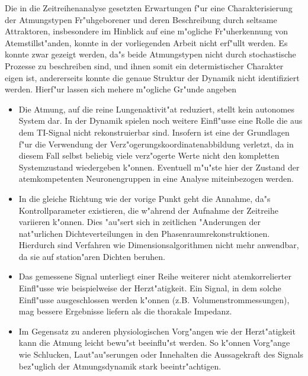 
Die in die Zeitreihenanalyse gesetzten Erwartungen f"ur eine Charakterisierung der
Atmungstypen Fr"uhgeborener und deren Beschreibung durch seltsame Attraktoren,
insbesondere im Hinblick auf eine m"ogliche Fr"uherkennung von Atemstillst"anden, konnte
in der vorliegenden Arbeit nicht erf"ullt werden. Es konnte zwar gezeigt werden, da"s
beide Atmungstypen nicht durch stochastische Prozesse zu beschreiben sind, und ihnen somit
ein determistischer Charakter eigen ist, andererseits konnte die genaue Struktur der
Dynamik nicht identifiziert werden. Hierf"ur lassen sich mehere m"ogliche Gr"unde angeben

\begin{itemize}
\item Die Atmung, auf die reine Lungenaktivit"at reduziert, stellt kein autonomes System
  dar. In der Dynamik spielen noch weitere Einfl"usse eine Rolle die aus dem TI-Signal
  nicht rekonstruierbar sind. Insofern ist eine der Grundlagen f"ur die Verwendung der
  Verz"ogerungskoordinatenabbildung verletzt, da in diesem Fall selbst beliebig viele verz"ogerte
  Werte nicht den kompletten Systemzustand wiedergeben k"onnen.  Eventuell m"u"ste hier
  der Zustand der atemkompetenten Neuronengruppen in eine Analyse miteinbezogen werden.
  
\item In die gleiche Richtung wie der vorige Punkt geht die Annahme, da"s
  Kontrollparameter existieren, die w"ahrend der Aufnahme der Zeitreihe variieren k"onnen.
  Dies "au"sert sich in zeitlichen "Anderungen der nat"urlichen Dichteverteilungen in den
  Phasenraumrekonstruktionen. Hierdurch sind Verfahren wie Dimensionsalgorithmen nicht
  mehr anwendbar, da sie auf station"aren Dichten beruhen.
  
\item Das gemessene Signal unterliegt einer Reihe weiterer nicht atemkorrelierter
  Einfl"usse wie beispielweise der Herzt"atigkeit. Ein Signal, in dem solche Einfl"usse
  ausgeschlossen werden k"onnen (z.B. Volumenstrommessungen), mag bessere Ergebnisse
  liefern als die thorakale Impedanz.
  
\item Im Gegensatz zu anderen physiologischen Vorg"angen wie der Herzt"atigkeit kann die
  Atmung leicht bewu"st beeinflu"st werden. So k"onnen Vorg"ange wie Schlucken,
  Laut"au"serungen oder Innehalten die Aussagekraft des Signals bez"uglich der
  Atmungsdynamik stark beeintr"achtigen.
\end{itemize}




